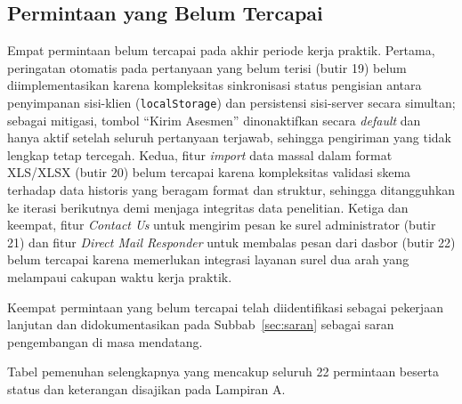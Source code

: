\subsection{Permintaan yang Belum Tercapai}
\label{subsec:belum-tercapai}

Empat permintaan belum tercapai pada akhir periode kerja praktik. Pertama, peringatan otomatis pada pertanyaan yang belum terisi (butir 19) belum diimplementasikan karena kompleksitas sinkronisasi status pengisian antara penyimpanan sisi-klien (\texttt{localStorage}) dan persistensi sisi-server secara simultan; sebagai mitigasi, tombol ``Kirim Asesmen'' dinonaktifkan secara \textit{default} dan hanya aktif setelah seluruh pertanyaan terjawab, sehingga pengiriman yang tidak lengkap tetap tercegah. Kedua, fitur \textit{import} data massal dalam format XLS/XLSX (butir 20) belum tercapai karena kompleksitas validasi skema terhadap data historis yang beragam format dan struktur, sehingga ditangguhkan ke iterasi berikutnya demi menjaga integritas data penelitian. Ketiga dan keempat, fitur \textit{Contact Us} untuk mengirim pesan ke surel administrator (butir 21) dan fitur \textit{Direct Mail Responder} untuk membalas pesan dari dasbor (butir 22) belum tercapai karena memerlukan integrasi layanan surel dua arah yang melampaui cakupan waktu kerja praktik.

Keempat permintaan yang belum tercapai telah diidentifikasi sebagai pekerjaan lanjutan dan didokumentasikan pada Subbab~\ref{sec:saran} sebagai saran pengembangan di masa mendatang.

Tabel pemenuhan selengkapnya yang mencakup seluruh 22 permintaan beserta status dan keterangan disajikan pada Lampiran A.
